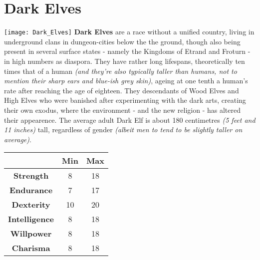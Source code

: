 \documentclass[openany,10pt,a4paper]{book}
\begin{document}
\section{Dark Elves}
\texttt{[image: Dark\_Elves]}\newline
\textbf{Dark Elves} are a race without a unified country, living in underground clans in dungeon-cities below the the ground, though also being present in several surface states - namely the Kingdoms of Etrand and Froturn - in high numbers as diaspora. They have rather long lifespans, theoretically ten times that of a human \textit{(and they're also typically taller than humans, not to mention their sharp ears and blue-ish grey skin)}, ageing at one tenth a human's rate after reaching the age of eighteen. They descendants of Wood Elves and High Elves who were banished after experimenting with the dark arts, creating their own exodus, where the environment - and the new religion - has altered their appearence. The average adult Dark Elf is about 180 centimetres \textit{(5 feet and 11 inches)} tall, regardless of gender \textit{(albeit men to tend to be slightly taller on average)}.\newline
\begin{tabular}{|c|c|c|}
\hline
 & \textbf{Min} & \textbf{Max} \\ \hline
\textbf{Strength} & 8 & 18 \\ \hline
\textbf{Endurance} & 7 & 17 \\ \hline
\textbf{Dexterity} & 10 & 20 \\ \hline
\textbf{Intelligence} & 8 & 18 \\ \hline
\textbf{Willpower} & 8 & 18 \\ \hline
\textbf{Charisma} & 8 & 18 \\ \hline
\end{tabular}\newline
{} \newpage
\end{document}
